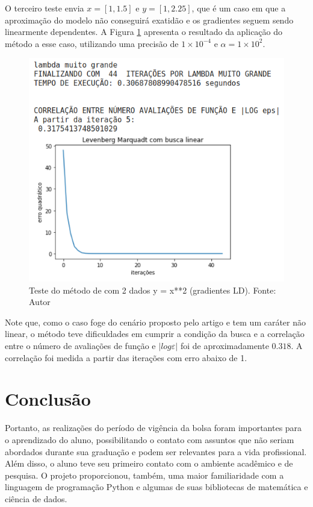 \documentclass[11pt]{article}
\begin{document}
O terceiro teste envia $x = [1,1.5]$ e $y = [1,2.25]$, que é um caso em que a aproximação do modelo não conseguirá exatidão e os gradientes seguem sendo linearmente dependentes. A Figura \ref{lmbl3} apresenta o resultado da aplicação do método a esse caso, utilizando uma precisão de $1\times10^{-4}$ e $\alpha = 1\times10^{2}$. 

\begin{figure}[H]
\center
\includegraphics[scale=0.5]{Figuras/lmbl3.png}
\caption{Teste do método de \cite{bmLS} com 2 dados y = x**2 (gradientes LD). Fonte: Autor} 
\label{lmbl3}
\end{figure}

Note que, como o caso foge do cenário proposto pelo artigo e tem um caráter não linear, o método teve dificuldades em cumprir a condição da busca e a correlação entre o número de avaliações de função e $|log \varepsilon|$ foi de aproximadamente $0.318$. A correlação foi medida a partir das iterações com erro abaixo de 1.

\section{Conclusão}
Portanto, as realizações do período de vigência da bolsa foram importantes para o aprendizado do aluno, possibilitando o contato com assuntos que não seriam abordados durante sua graduação e podem ser relevantes para a vida profissional. Além disso, o aluno teve seu primeiro contato com o ambiente acadêmico e de pesquisa. O projeto proporcionou, também, uma maior familiaridade com a linguagem de programação Python e algumas de suas bibliotecas de matemática e ciência de dados.
\end{document}
